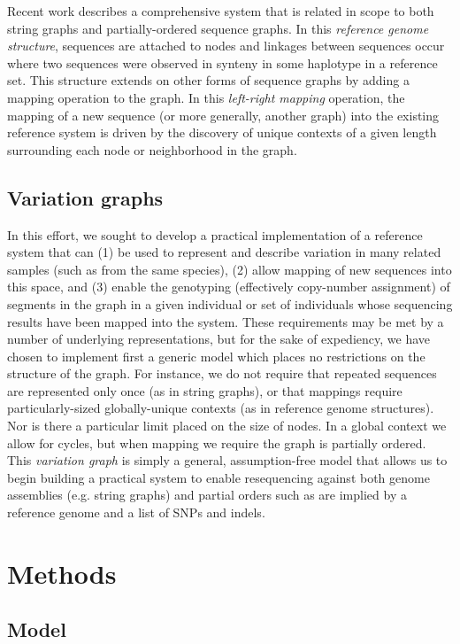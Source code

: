 \documentclass{article}
\begin{document}
Recent work \cite{paten2014} describes a comprehensive system that is related in scope to both string graphs and partially-ordered sequence graphs. In this \emph{reference genome structure}, sequences are attached to nodes and linkages between sequences occur where two sequences were observed in synteny in some haplotype in a reference set. This structure extends on other forms of sequence graphs by adding a mapping operation to the graph. In this \emph{left-right mapping} operation, the mapping of a new sequence (or more generally, another graph) into the existing reference system is driven by the discovery of unique contexts of a given length surrounding each node or neighborhood in the graph.

\subsection{Variation graphs}

In this effort, we sought to develop a practical implementation of a reference system that can (1) be used to represent and describe variation in many related samples (such as from the same species), (2) allow mapping of new sequences into this space, and (3) enable the genotyping (effectively copy-number assignment) of segments in the graph in a given individual or set of individuals whose sequencing results have been mapped into the system. These requirements may be met by a number of underlying representations, but for the sake of expediency, we have chosen to implement first a generic model which places no restrictions on the structure of the graph. For instance, we do not require that repeated sequences are represented only once (as in string graphs), or that mappings require particularly-sized globally-unique contexts (as in reference genome structures). Nor is there a particular limit placed on the size of nodes. In a global context we allow for cycles, but when mapping we require the graph is partially ordered. This \emph{variation graph} is simply a general, assumption-free model that allows us to begin building a practical system to enable resequencing against both genome assemblies (e.g. string graphs) and partial orders such as are implied by a reference genome and a list of SNPs and indels.

\section{Methods}

\subsection{Model}
\end{document}

